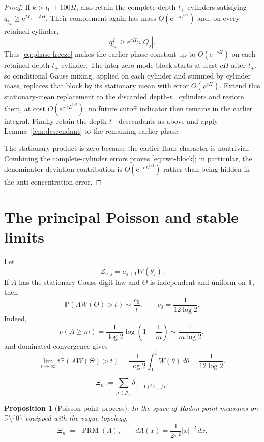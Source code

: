 \documentclass[11pt,a4paper]{amsart}
\newtheorem{proposition}[theorem]{Proposition}
\theoremstyle{definition}
\theoremstyle{remark}
\newcommand{\T}{\mathbb T}
\newcommand{\R}{\mathbb R}
\newcommand{\Pp}{\mathbb P}
\newcommand{\e}{\mathrm e}
\begin{document}
\begin{proof}
If $k>t_0+100H$, also retain the complete depth-$t_+$ cylinders satisfying
$q_{t_+}\ge\e^{\lambda t_+-\delta H}$.  Their complement again has mass
$O(\e^{-cL^{1/2}})$ and, on every retained cylinder,
\[
 q_{t_+}^2\ge\e^{cH}n|Q_j|.
\]
Thus \eqref{eq:phase-freeze} makes the earlier phase constant up to
$O(\e^{-cH})$ on each retained depth-$t_+$ cylinder.  The later zero-mode
block starts at least $cH$ after $t_+$, so conditional Gauss mixing, applied
on each cylinder and summed by cylinder mass, replaces that block by its
stationary mean with error $O(\rho^{cH})$.  Extend this stationary-mean
replacement to the discarded depth-$t_+$ cylinders and restore them, at cost
$O(\e^{-cL^{1/2}})$; no future cutoff indicator then remains in the earlier
integral.  Finally retain the depth-$t_-$ descendants
as above and apply Lemma~\ref{lem:descendant} to the remaining earlier phase.

The stationary product is zero because the earlier Haar character is
nontrivial.  Combining the complete-cylinder errors proves
\eqref{eq:two-block}; in particular, the denominator-deviation contribution
is $O(\e^{-cL^{1/2}})$ rather than being hidden in the anti-concentration
error.
\end{proof}



\section{The principal Poisson and stable limits}

Let
\[
 Z_{n,j}=a_{j+1}W(\theta_j).
\]
If $A$ has the stationary Gauss digit law and $\Theta$ is independent and
uniform on $\T$, then
\begin{equation}\label{eq:stationary-tail}
 \Pp(AW(\Theta)>t)\sim\frac{c_0}{t},
 \qquad c_0=\frac1{12\log2}.
\end{equation}
Indeed,
\[
 \nu(A\ge m)=\frac1{\log2}\log\left(1+\frac1m\right)
 \sim\frac1{m\log2},
\]
and dominated convergence gives
\[
 \lim_{t\to\infty}t\Pp(AW(\Theta)>t)
 =\frac1{\log2}\int_0^1W(\theta)\,d\theta
 =\frac1{12\log2}.
\]

\begin{equation}\label{eq:Xi-def}
 \Xi_n:=\sum_{j\in\mathcal J_n}\delta_{(-1)^jZ_{n,j}/L}.
\end{equation}

\begin{proposition}[Poisson point process]\label{prop:PPP}
In the space of Radon point measures on $\R\setminus\{0\}$ equipped with
the vague topology,
\begin{equation}\label{eq:PPP}
 \Xi_n
 \ \Longrightarrow\
 \operatorname{PRM}(\Lambda),
 \qquad
 d\Lambda(x)=\frac1{2\pi^2}|x|^{-2}\,dx.
\end{equation}
\end{proposition}
\end{document}
